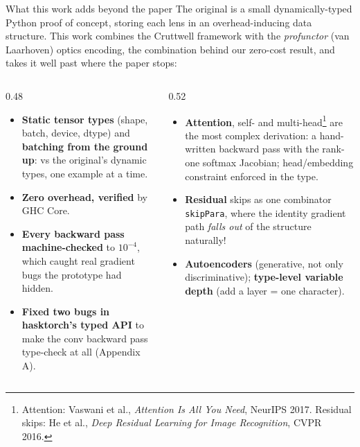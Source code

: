 \documentclass[aspectratio=169,11pt]{beamer}
\begin{document}
\begin{frame}{What this work adds beyond the paper}
  \footnotesize The original is a small dynamically-typed Python proof of concept, storing each
  lens in an overhead-inducing data structure. This work combines the Cruttwell framework with the \emph{profunctor}
  (van Laarhoven) optics encoding, the combination behind our zero-cost result, and takes it well
  past where the paper stops:
  \begin{columns}[T]
    \begin{column}{0.48\textwidth}
      \begin{itemize}\footnotesize\setlength\itemsep{0.2em}
        \item \textbf{Static tensor types} (shape, batch, device, dtype) and \textbf{batching from the
              ground up}: vs the original's dynamic types, one example at a time.
        \item \textbf{Zero overhead, verified} by GHC Core.
        \item \textbf{Every backward pass machine-checked} to $10^{-4}$, which caught real gradient
              bugs the prototype had hidden.
        \item \textbf{Fixed two bugs in hasktorch's typed API} to make the conv backward pass
              type-check at all (Appendix A).
      \end{itemize}
    \end{column}
    \begin{column}{0.52\textwidth}
      \begin{itemize}\footnotesize\setlength\itemsep{0.25em}
        \item \textbf{Attention}, self- and multi-head\footnote[frame]{Attention: Vaswani et al., \emph{Attention Is All You Need}, NeurIPS 2017. Residual skips: He et al., \emph{Deep Residual Learning for Image Recognition}, CVPR 2016.} are the most complex derivation: a hand-written
              backward pass with the rank-one softmax Jacobian; head/embedding constraint enforced in the type.
        \item \textbf{Residual} skips as one combinator \texttt{skipPara}, where the identity gradient
              path \emph{falls out} of the structure naturally!
        \item \textbf{Autoencoders} (generative, not only discriminative); \textbf{type-level variable
              depth} (add a layer = one character).
      \end{itemize}
    \end{column}
  \end{columns}
  \vspace{0.4em}
\end{frame}
\end{document}
